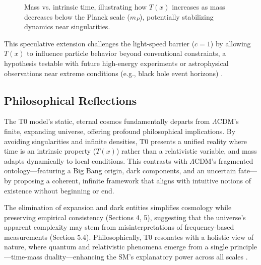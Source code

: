 \documentclass[12pt,a4paper]{article}
\newcommand{\Tfield}{T(x)}
\begin{document}
	\begin{figure}[h]
		\centering
		\caption{Mass vs. intrinsic time, illustrating how \(\Tfield\) increases as mass decreases below the Planck scale (\(m_P\)), potentially stabilizing dynamics near singularities.}
		\label{fig:mass_time}
	\end{figure}
	
	This speculative extension challenges the light-speed barrier (\(c = 1\)) by allowing \(\Tfield\) to influence particle behavior beyond conventional constraints, a hypothesis testable with future high-energy experiments or astrophysical observations near extreme conditions (e.g., black hole event horizons) \cite{pascher_planck_2025}.
	
	\subsection{Philosophical Reflections}
	\label{subsec:philosophical_reflections}
	
	The T0 model’s static, eternal cosmos fundamentally departs from \(\Lambda\)CDM’s finite, expanding universe, offering profound philosophical implications. By avoiding singularities and infinite densities, T0 presents a unified reality where time is an intrinsic property (\(\Tfield\)) rather than a relativistic variable, and mass adapts dynamically to local conditions. This contrasts with \(\Lambda\)CDM’s fragmented ontology—featuring a Big Bang origin, dark components, and an uncertain fate—by proposing a coherent, infinite framework that aligns with intuitive notions of existence without beginning or end.
	
	The elimination of expansion and dark entities simplifies cosmology while preserving empirical consistency (Sections 4, 5), suggesting that the universe’s apparent complexity may stem from misinterpretations of frequency-based measurements (Section 5.4). Philosophically, T0 resonates with a holistic view of nature, where quantum and relativistic phenomena emerge from a single principle—time-mass duality—enhancing the SM’s explanatory power across all scales \cite{pascher_perspective_2025}.
	
\end{document}
